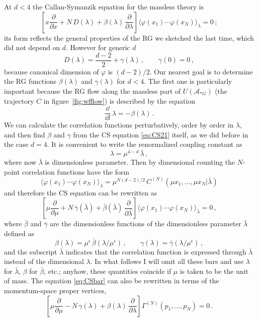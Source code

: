 At $d<4$ the Callan-Symanzik equation for the massless theory is
\begin{equation}\label{eq:CS21}
\left[x\frac\partial{\partial x}+N\,D(\lambda)+\beta(\lambda)\,\frac\partial{\partial\lambda}\right]\bigl\langle\varphi(x_1)\cdots\varphi(x_N)\bigr\rangle_\lambda=0\,;
\end{equation}
its form reflects the general properties of the RG we sketched the last time,
which did not depend on $d$. However for generic $d$
\[
D(\lambda)=\frac{d-2}2+\gamma(\lambda)\,,\qquad\gamma(0)=0\,,
\]
because canonical dimension of $\varphi$ is $(d-2)/2$. Our nearest goal is to
determine the RG functions $\beta(\lambda)$ and $\gamma(\lambda)$ for $d<4$. The
first one is particularly important because the RG flow along the massless part of
$U(\mathcal A_{*G})$ (the trajectory $C$ in figure~\ref{fig:wfflow}) is described
by the equation
\[
\frac{\dd}{\dd l}\,\lambda=-\beta(\lambda)\,.
\]
We can calculate the correlation functions perturbatively, order by order in
$\lambda$, and then find $\beta$ and $\gamma$ from the CS equation \eqref{eq:CS21}
itself, as we did before in the case $d=4$. It is convenient to write the
renormalized coupling constant as
\[
\lambda=\mu^{4-d}\,\bar\lambda\,,
\]
where now $\bar\lambda$ is dimensionless parameter. Then by dimensional counting
the $N$-point correlation functions have the form
\[
\bigl\langle\varphi(x_1)\cdots\varphi(x_N)\bigr\rangle_\lambda=\mu^{N(d-2)/2}\,C^{(N)}(\mu x_1,\dots,\mu x_N|\bar\lambda)
\]
and therefore the CS equation can be rewritten as
\begin{equation}\label{eq:CSbar}
\left[\mu\frac\partial{\partial\mu}+N\,\bar\gamma(\bar\lambda)+\bar\beta(\bar\lambda)\,\frac\partial{\partial\bar\lambda}\right]\bigl\langle\varphi(x_1)\cdots\varphi(x_N)\bigr\rangle_{\bar\lambda}=0\,,
\end{equation}
where $\bar\beta$ and $\bar\gamma$ are the dimensionless functions of the
dimensionless parameter $\bar\lambda$ defined as
\[
\beta(\lambda)=\mu^\epsilon\,\bar\beta(\lambda/\mu^\epsilon)\,,\qquad\gamma(\lambda)=\bar\gamma(\lambda/\mu^\epsilon)\,,
\]
and the subscript $\bar\lambda$ indicates that the correlation function is
expressed through $\bar\lambda$ instead of the dimensional $\lambda$. In what
follows I will omit all these bars and use $\lambda$ for $\bar\lambda$, $\beta$
for $\bar\beta$, etc.; anyhow, these quantities coincide if $\mu$ is taken to be
the unit of mass. The equation \eqref{eq:CSbar} can also be rewritten in terms of
the momentum-space proper vertices,
\begin{equation}\label{eq:CSGamma21}
\left[\mu\frac\partial{\partial\mu}-N\,\gamma(\lambda)+\beta(\lambda)\,\frac\partial{\partial\lambda}\right]\Gamma^{(N)}(p_1,\dots,p_N)=0\,.
\end{equation}

